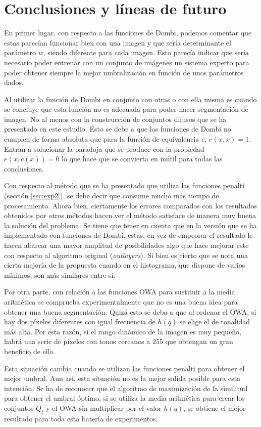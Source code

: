 \documentclass[main]{subfiles}
\begin{document}
\chapter{Conclusiones y líneas de futuro}\label{cap:conclusiones}

En primer lugar, con respecto a las funciones de Dombi, podemos comentar que estas parecían funcionar bien con una imagen y que sería determinante el parámetro $w$, siendo diferente para cada imagen. Esto parecía indicar que sería necesario poder entrenar con un conjunto de imágenes un sistema experto para poder obtener siempre la mejor umbralización en función de unos parámetros dados.

Al utilizar la función de Dombi en conjunto con otras o con ella misma es cuando se concluye que esta función no es adecuada para poder hacer segmentación de imagen. No al menos con la construcción de conjuntos difusos que se ha presentado en este estudio. Esto se debe a que las funciones de Dombi no cumplen de forma absoluta que para la función de equivalencia $e$, $e(x,x)=1$. Entran a solucionar la paradoja que se produce con la propiedad $e(x,c(x))=0$ lo que hace que se convierta en inútil para todas las conclusiones.

Con respecto al método que se ha presentado que utiliza las funciones penalti (sección \ref{sec:exp2}), se debe decir que consume mucho más tiempo de procesamiento. Ahora bien, ciertamente los errores comparados con los resultados obtenidos por otros métodos hacen ver el método satisface de manera muy buena la solución del problema. Se tiene que tener en cuenta que en la versión que se ha implementado con funciones de Dombi, estas, en vez de empeorar el resultado le hacen abarcar una mayor amplitud de posibilidades algo que hace mejorar este con respecto al algoritmo original ({\em outlayers}). Si bien es cierto que se nota una cierta mejoría de la propuesta cuando en el histograma, que dispone de varios mínimos, son más similares entre sí.

Por otra parte, con relación a las funciones OWA para sustituir a la media aritmética se comprueba experimentalmente que no es una buena idea para obtener una buena segmentación. Quizá esto se deba a que al ordenar el OWA, si hay dos píxeles diferentes con igual frecuencia de $h(q)$ se elige el de tonalidad más alta. Por esta razón, si el rango dinámico de la imagen es muy pequeño, habrá una serie de píxeles con tonos cercanos a 255 que obtengan un gran beneficio de ello.

Esta situación cambia cuando se utilizan las funciones penalti para obtener el mejor umbral. Aun así, esta situación no es la mejor salida posible para esta intención. Se ha de reconocer que el algoritmo de maximización de la similitud para obtener el umbral óptimo, si se utiliza la media aritmética para crear los conjuntos $Q_t$ y el OWA sin multiplicar por el valor $h(q)$, se obtiene el mejor resultado para toda esta batería de experimentos.
\end{document}
